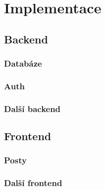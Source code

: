 \newpage

\section{Implementace}
\subsection{Backend}




\newpage
\subsubsection{Databáze}



\newpage
\subsubsection{Auth}


\subsubsection{Další backend}



\subsection{Frontend}



\subsubsection{Posty}

\subsubsection{Další frontend}